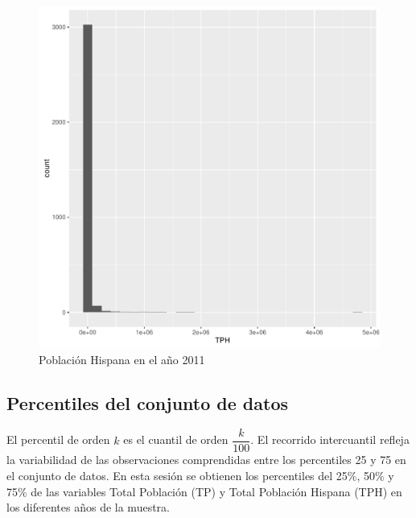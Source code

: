 \begin{figure}[H]
	\centering
\begin{knitrout}
\color{fgcolor}\begin{kframe}
\begin{alltt}
         \hlopt{+} \hlstd{()}
\end{alltt}
\end{kframe}
\includegraphics[width=\maxwidth]{figure/pobHisp2011-1} 

\end{knitrout}
	\caption{Población Hispana en el año 2011}
\end{figure}

\subsection{Percentiles del conjunto de datos}
El percentil de orden \(k\) es el cuantil de orden \(\dfrac {k} {100}\). El recorrido intercuantil refleja la variabilidad de las observaciones comprendidas entre los percentiles 25 y 75 en el conjunto de datos. En esta sesión se obtienen los percentiles del 25\%,  50\% y 75\% de las variables Total Población (TP) y Total Población Hispana (TPH) en los diferentes años de la muestra.

